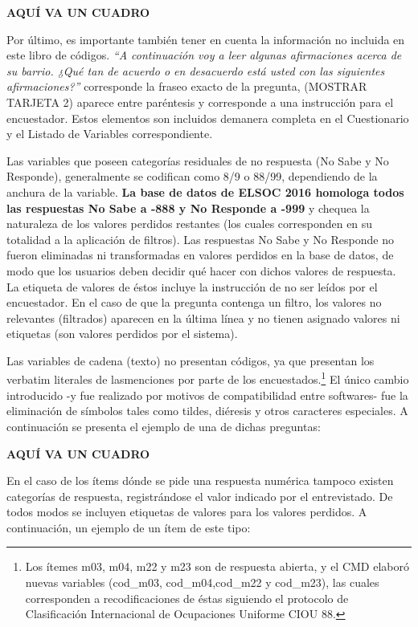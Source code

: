 \documentclass[
]{book}
\begin{document}
\textbf{AQUÍ VA UN CUADRO}

Por último, es importante también tener en cuenta la información no
incluida en este libro de códigos. \emph{``A continuación voy a leer
algunas afirmaciones acerca de su barrio. ¿Qué tan de acuerdo o en
desacuerdo está usted con las siguientes afirmaciones?''} corresponde la
fraseo exacto de la pregunta, (MOSTRAR TARJETA 2) aparece entre
paréntesis y corresponde a una instrucción para el encuestador. Estos
elementos son incluidos demanera completa en el Cuestionario y el
Listado de Variables correspondiente.

Las variables que poseen categorías residuales de no respuesta (No Sabe
y No Responde), generalmente se codifican como 8/9 o 88/99, dependiendo
de la anchura de la variable. \textbf{La base de datos de ELSOC 2016
homologa todos las respuestas No Sabe a -888 y No Responde a -999} y
chequea la naturaleza de los valores perdidos restantes (los cuales
corresponden en su totalidad a la aplicación de filtros). Las respuestas
No Sabe y No Responde no fueron eliminadas ni transformadas en valores
perdidos en la base de datos, de modo que los usuarios deben decidir qué
hacer con dichos valores de respuesta. La etiqueta de valores de éstos
incluye la instrucción de no ser leídos por el encuestador. En el caso
de que la pregunta contenga un filtro, los valores no relevantes
(filtrados) aparecen en la última línea y no tienen asignado valores ni
etiquetas (son valores perdidos por el sistema).

Las variables de cadena (texto) no presentan códigos, ya que presentan
los verbatim literales de lasmenciones por parte de los
encuestados.\footnote{Los ítemes m03, m04, m22 y m23 son de respuesta
  abierta, y el CMD elaboró nuevas variables (cod\_m03,
  cod\_m04,cod\_m22 y cod\_m23), las cuales corresponden a
  recodificaciones de éstas siguiendo el protocolo de Clasificación
  Internacional de Ocupaciones Uniforme CIOU 88.} El único cambio
introducido -y fue realizado por motivos de compatibilidad entre
softwares- fue la eliminación de símbolos tales como tildes, diéresis y
otros caracteres especiales. A continuación se presenta el ejemplo de
una de dichas preguntas:

\textbf{AQUÍ VA UN CUADRO}

En el caso de los ítems dónde se pide una respuesta numérica tampoco
existen categorías de respuesta, registrándose el valor indicado por el
entrevistado. De todos modos se incluyen etiquetas de valores para los
valores perdidos. A continuación, un ejemplo de un ítem de este tipo:
\end{document}
